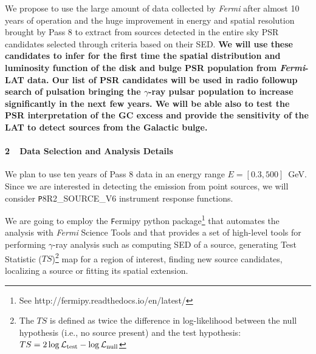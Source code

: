 \documentclass[12pt,twoside,letterpaper,onecolumn,english]{article}
\begin{document}

We propose to use the large amount of data collected by {\it Fermi} after almost 10 years of operation and the
huge improvement in energy and spatial resolution brought by Pass 8 \cite{2013arXiv1303.3514A} to extract from sources detected in the entire sky PSR candidates selected through criteria based on their SED.
{\bf We will use these candidates to infer for the first time the spatial distribution and luminosity function of the disk and bulge PSR population from {\it Fermi}-LAT data. 
Our list of PSR candidates will be used in radio followup search of pulsation bringing the $\gamma$-ray pulsar population to increase significantly in the next few years.
We will be able also to test the PSR interpretation of the GC excess and provide the sensitivity of the LAT to detect sources from the Galactic bulge.}





\paragraph{2\ \ Data Selection and Analysis Details}
\label{sec:details}

We plan to use ten years of Pass 8 data in an energy range $E=[0.3,500]$~GeV.
Since we are interested in detecting the emission
from point sources, we will consider {\texttt P8R2\_SOURCE\_V6} 
instrument response functions. 

We are going to employ the {\texttt Fermipy} python package\footnote{See
  http://fermipy.readthedocs.io/en/latest/} that automates the analysis with {\it Fermi} Science Tools and that provides a set of high-level tools for performing $\gamma$-ray analysis such as computing SED of a source, generating Test Statistic ($TS$)\footnote{The $TS$ is defined as twice the difference in log-likelihood between the null hypothesis (i.e., no source present) and the test hypothesis: $TS = 2 \log\mathcal{L}_{\rm test} - \log\mathcal{L}_{\rm null}$} map for a region of interest, finding new source candidates, localizing a source or fitting its spatial extension.
\end{document}
